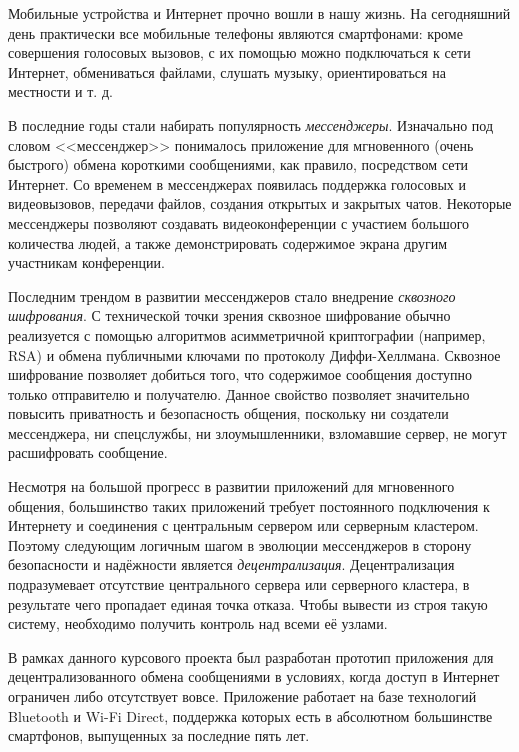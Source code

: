 
\label{sec:intro}

Мобильные устройства и Интернет прочно вошли в нашу жизнь.
На сегодняшний день практически все мобильные телефоны являются смартфонами: кроме совершения голосовых вызовов, с их помощью можно подключаться к сети Интернет, обмениваться файлами, слушать музыку, ориентироваться на местности и т. д.

В последние годы стали набирать популярность \textit{мессенджеры}.
Изначально под словом <<мессенджер>> понималось приложение для мгновенного (очень быстрого) обмена короткими сообщениями, как правило, посредством сети Интернет.
Со временем в мессенджерах появилась поддержка голосовых и видеовызовов, передачи файлов, создания открытых и закрытых чатов.
Некоторые мессенджеры позволяют создавать видеоконференции с участием большого количества людей, а также демонстрировать содержимое экрана другим участникам конференции.

Последним трендом в развитии мессенджеров стало внедрение \textit{сквозного шифрования}.
С технической точки зрения сквозное шифрование обычно реализуется с помощью алгоритмов асимметричной криптографии (например, RSA) и обмена публичными ключами по протоколу Диффи-Хеллмана. Сквозное шифрование позволяет добиться того, что содержимое сообщения доступно только отправителю и получателю.
Данное свойство позволяет значительно повысить приватность и безопасность общения, поскольку ни создатели мессенджера, ни спецслужбы, ни злоумышленники, взломавшие сервер, не могут расшифровать сообщение.

Несмотря на большой прогресс в развитии приложений для мгновенного общения, большинство таких приложений требует постоянного подключения к Интернету и соединения с центральным сервером или серверным кластером.
Поэтому следующим логичным шагом в эволюции мессенджеров в сторону безопасности и надёжности является \textit{децентрализация}.
Децентрализация подразумевает отсутствие центрального сервера или серверного кластера, в результате чего пропадает единая точка отказа.
Чтобы вывести из строя такую систему, необходимо получить контроль над всеми её узлами.

В рамках данного курсового проекта был разработан прототип приложения для децентрализованного обмена сообщениями в условиях, когда доступ в Интернет ограничен либо отсутствует вовсе.
Приложение работает на базе технологий Bluetooth и Wi-Fi Direct, поддержка которых есть в абсолютном большинстве смартфонов, выпущенных за последние пять лет.
